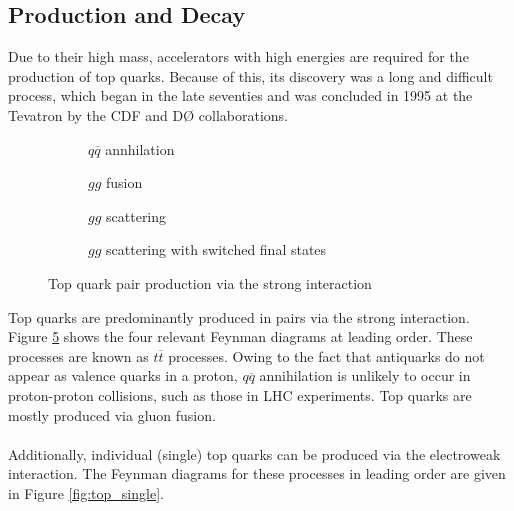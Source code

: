 \subsection{Production and Decay}
Due to their high mass, accelerators with high energies are required for the production of top quarks. Because of this, its discovery was a long and difficult process, which began in the late seventies \cite{RevModPhys.69.137} and was concluded in 1995 at the Tevatron by the CDF and D\O{} collaborations.
\begin{figure}[H]
    \centering
    \begin{subfigure}[t]{0.2\textwidth}
        \centering
        
        \caption{$q\overline{q}$ annhilation}
        \label{fig:top_pair_qqbar}
    \end{subfigure}\hfill
    \begin{subfigure}[t]{0.2\textwidth}
        \centering
        
        \caption{$gg$ fusion}
        \label{fig:top_pair_gg}
    \end{subfigure}\hfill
    \begin{subfigure}[t]{0.2\textwidth}
        \centering
        
        \caption{$gg$ scattering}
        \label{fig:top_pair_gg_scatter}
    \end{subfigure}\hfill
    \begin{subfigure}[t]{0.2\textwidth}
        \centering
        
        \caption{$gg$ scattering with switched final states}
        \label{fig:top_pair_gg_scatter_switched}
    \end{subfigure}
    \caption{Top quark pair production via the strong interaction}
    \label{fig:top_pair}
\end{figure}
Top quarks are predominantly produced in pairs via the strong interaction. Figure \ref{fig:top_pair} shows the four relevant Feynman diagrams at leading order. These processes are known as $t\overline{t}$ processes. Owing to the fact that antiquarks do not appear as valence quarks in a proton, $q\overline{q}$ annihilation is unlikely to occur in proton-proton collisions, such as those in LHC experiments. Top quarks are mostly produced via gluon fusion.\\ \\
Additionally, individual (single) top quarks can be produced via the electroweak interaction. The Feynman diagrams for these processes in leading order are given in Figure \ref{fig:top_single}.
